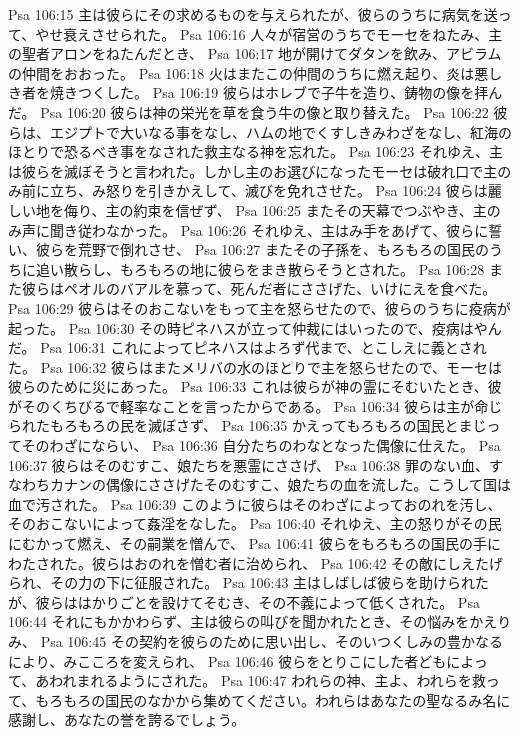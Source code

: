 Psa 106:15  主は彼らにその求めるものを与えられたが、彼らのうちに病気を送って、やせ衰えさせられた。
Psa 106:16  人々が宿営のうちでモーセをねたみ、主の聖者アロンをねたんだとき、
Psa 106:17  地が開けてダタンを飲み、アビラムの仲間をおおった。
Psa 106:18  火はまたこの仲間のうちに燃え起り、炎は悪しき者を焼きつくした。
Psa 106:19  彼らはホレブで子牛を造り、鋳物の像を拝んだ。
Psa 106:20  彼らは神の栄光を草を食う牛の像と取り替えた。
Psa 106:22  彼らは、エジプトで大いなる事をなし、ハムの地でくすしきみわざをなし、紅海のほとりで恐るべき事をなされた救主なる神を忘れた。
Psa 106:23  それゆえ、主は彼らを滅ぼそうと言われた。しかし主のお選びになったモーセは破れ口で主のみ前に立ち、み怒りを引きかえして、滅びを免れさせた。
Psa 106:24  彼らは麗しい地を侮り、主の約束を信ぜず、
Psa 106:25  またその天幕でつぶやき、主のみ声に聞き従わなかった。
Psa 106:26  それゆえ、主はみ手をあげて、彼らに誓い、彼らを荒野で倒れさせ、
Psa 106:27  またその子孫を、もろもろの国民のうちに追い散らし、もろもろの地に彼らをまき散らそうとされた。
Psa 106:28  また彼らはペオルのバアルを慕って、死んだ者にささげた、いけにえを食べた。
Psa 106:29  彼らはそのおこないをもって主を怒らせたので、彼らのうちに疫病が起った。
Psa 106:30  その時ピネハスが立って仲裁にはいったので、疫病はやんだ。
Psa 106:31  これによってピネハスはよろず代まで、とこしえに義とされた。
Psa 106:32  彼らはまたメリバの水のほとりで主を怒らせたので、モーセは彼らのために災にあった。
Psa 106:33  これは彼らが神の霊にそむいたとき、彼がそのくちびるで軽率なことを言ったからである。
Psa 106:34  彼らは主が命じられたもろもろの民を滅ぼさず、
Psa 106:35  かえってもろもろの国民とまじってそのわざにならい、
Psa 106:36  自分たちのわなとなった偶像に仕えた。
Psa 106:37  彼らはそのむすこ、娘たちを悪霊にささげ、
Psa 106:38  罪のない血、すなわちカナンの偶像にささげたそのむすこ、娘たちの血を流した。こうして国は血で汚された。
Psa 106:39  このように彼らはそのわざによっておのれを汚し、そのおこないによって姦淫をなした。
Psa 106:40  それゆえ、主の怒りがその民にむかって燃え、その嗣業を憎んで、
Psa 106:41  彼らをもろもろの国民の手にわたされた。彼らはおのれを憎む者に治められ、
Psa 106:42  その敵にしえたげられ、その力の下に征服された。
Psa 106:43  主はしばしば彼らを助けられたが、彼らははかりごとを設けてそむき、その不義によって低くされた。
Psa 106:44  それにもかかわらず、主は彼らの叫びを聞かれたとき、その悩みをかえりみ、
Psa 106:45  その契約を彼らのために思い出し、そのいつくしみの豊かなるにより、みこころを変えられ、
Psa 106:46  彼らをとりこにした者どもによって、あわれまれるようにされた。
Psa 106:47  われらの神、主よ、われらを救って、もろもろの国民のなかから集めてください。われらはあなたの聖なるみ名に感謝し、あなたの誉を誇るでしょう。
